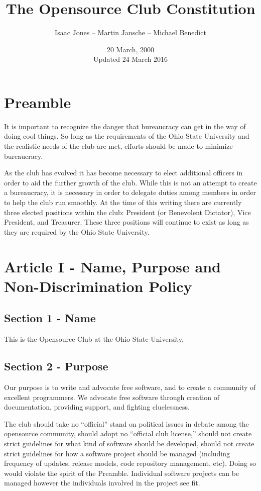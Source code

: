 \documentclass{article}
\title{The Opensource Club Constitution}
\author{Isaac Jones -- Martin Jansche -- Michael Benedict}
\date{20 March, 2000\\ Updated 24 March 2016}
\begin{document}
	\maketitle

	\section{Preamble}

	It is important to recognize the danger that bureaucracy can get in the way of doing cool things.  So long as the requirements of the Ohio State University and the realistic needs of the club are met, efforts should be made to minimize bureaucracy.

	As the club has evolved it has become necessary to elect additional officers in order to aid the further growth of the club. While this is not an attempt to create a bureaucracy, it is necessary in order to delegate duties among members in order to help the club run smoothly. At the time of this writing there are currently three elected positions within the club: President (or Benevolent Dictator), Vice President, and Treasurer. These three positions will continue to exist as long as they are required by the Ohio State University.

	\section{Article I - Name, Purpose and Non-Discrimination Policy}

	\subsection{Section 1 - Name}

	This is the Opensource Club at the Ohio State University.

	\subsection{Section 2 - Purpose}

	Our purpose is to write and advocate free software, and to create a community of excellent programmers. We advocate free software through creation of documentation, providing support, and fighting cluelessness.

	The club should take no ``official'' stand on political issues in debate among the opensource community, should adopt no ``official club license,'' should not create strict guidelines for what kind of software should be developed, should not create strict guidelines for how a software project should be managed (including frequency of updates, release models, code repository management, etc). Doing so would violate the spirit of the Preamble. Individual software projects can be managed however the individuals involved in the project see fit.
\end{document}
